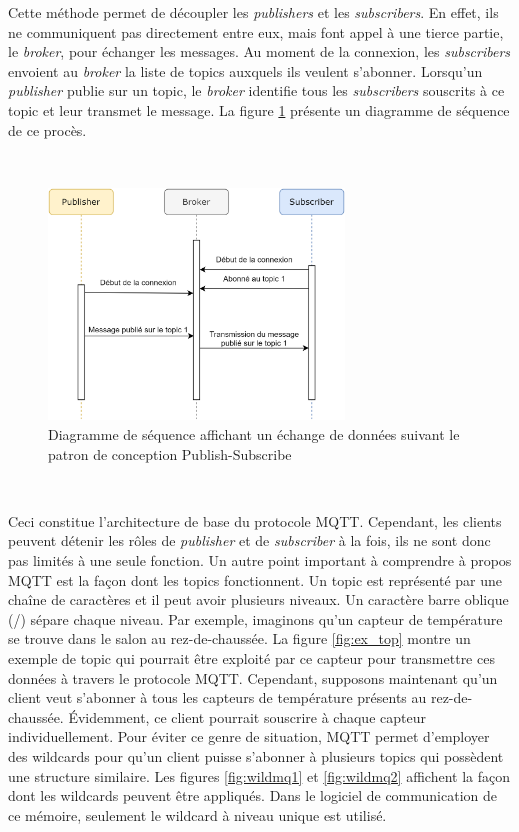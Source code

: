 \noindent
Cette méthode permet de découpler les \textit{publishers} et les \textit{subscribers}. En effet, ils ne communiquent pas directement entre eux, mais font appel à une tierce partie, le \textit{broker}, pour échanger les messages. Au moment de la connexion, les \textit{subscribers} envoient au \textit{broker} la liste de topics auxquels ils veulent s'abonner. Lorsqu'un \textit{publisher} publie sur un topic, le \textit{broker} identifie tous les \textit{subscribers} souscrits à ce topic et leur transmet le message. La figure \ref{fig:pub_sub_seq} présente un diagramme de séquence de ce procès.

~

\begin{figure}[ht!]
  \centering
  \includegraphics[width=0.7\textwidth]{img/app/process_pub_sub.png}
  \caption{Diagramme de séquence affichant un échange de données suivant le patron de conception Publish-Subscribe}
  \label{fig:pub_sub_seq}
\end{figure}

~

\noindent
Ceci constitue l'architecture de base du protocole MQTT. Cependant, les clients peuvent détenir les rôles de \textit{publisher} et de \textit{subscriber} à la fois, ils ne sont donc pas limités à une seule fonction. Un autre point important à comprendre à propos MQTT est la façon dont les topics fonctionnent. Un topic est représenté par une chaîne de caractères et il peut avoir plusieurs niveaux. Un caractère barre oblique (/) sépare chaque niveau. Par exemple, imaginons qu'un capteur de température se trouve dans le salon au rez-de-chaussée. La figure \ref{fig:ex_top} montre un exemple de topic qui pourrait être exploité par ce capteur pour transmettre ces données à travers le protocole MQTT. Cependant, supposons maintenant qu'un client veut s'abonner à tous les capteurs de température présents au rez-de-chaussée. Évidemment, ce client pourrait souscrire à chaque capteur individuellement. Pour éviter ce genre de situation, MQTT permet d'employer des wildcards pour qu'un client puisse s'abonner à plusieurs topics qui possèdent une structure similaire. Les figures \ref{fig:wildmq1} et \ref{fig:wildmq2} affichent la façon dont les wildcards peuvent être appliqués. Dans le logiciel de communication de ce mémoire, seulement le wildcard à niveau unique est utilisé.

